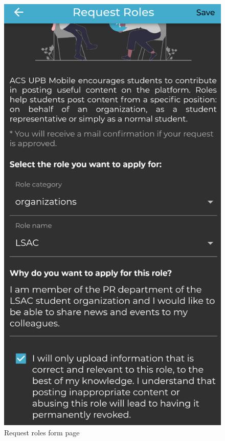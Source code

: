\begin{figure}[!ht]
\begin{minipage}[b]{0.32\textwidth}
    \end{minipage}
    \hfill
    \begin{minipage}[b]{0.32\textwidth}
        \captionsetup{justification=centering}
        \includegraphics[width=\textwidth]{figures/app/final/request-roles-completed-final.png}
        \caption{Request roles form page}
        \label{4:fig:request-roles-completed-final}
    \end{minipage}
\end{figure}

